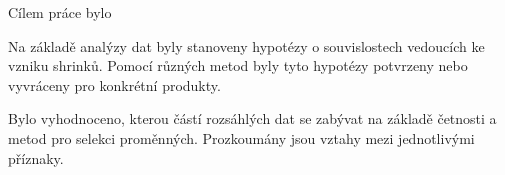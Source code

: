 Cílem práce bylo 

Na základě analýzy dat byly stanoveny hypotézy o souvislostech vedoucích ke vzniku shrinků. Pomocí různých metod byly tyto hypotézy potvrzeny nebo vyvráceny pro konkrétní produkty. 

Bylo vyhodnoceno, kterou částí rozsáhlých dat se zabývat na základě četnosti a metod pro selekci proměnných. Prozkoumány jsou vztahy mezi jednotlivými příznaky.